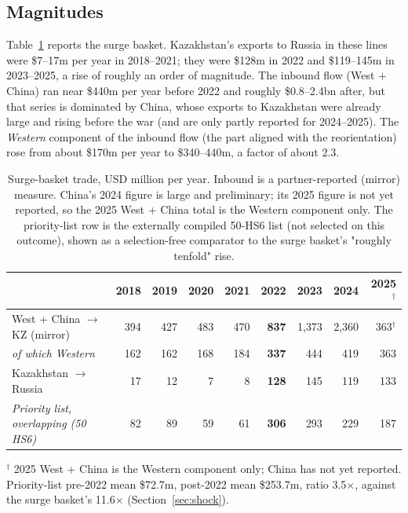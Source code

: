 \documentclass[12pt]{article}
\begin{document}
\subsection{Magnitudes}

Table~\ref{tab:magnitudes} reports the surge basket. Kazakhstan's exports to Russia in these
lines were \$7--17m per year in 2018--2021; they were \$128m in 2022 and \$119--145m in
2023--2025, a rise of roughly an order of magnitude. The inbound flow (West + China) ran near \$440m per year before 2022 and roughly
\$0.8--2.4bn after, but that series is dominated by China, whose exports to Kazakhstan were
already large and rising before the war (and are only partly reported for 2024--2025). The
\emph{Western} component of the inbound flow (the part aligned with the reorientation) rose
from about \$170m per year to \$340--440m, a factor of about $2.3$.

\begin{table}[t]
\centering
\caption{Surge-basket trade, USD million per year. Inbound is a partner-reported (mirror)
measure. China's 2024 figure is large and preliminary; its 2025 figure is not yet reported,
so the 2025 West + China total is the Western component only. The priority-list row is the
externally compiled 50-HS6 list (not selected on this outcome), shown as a selection-free
comparator to the surge basket's "roughly tenfold" rise.}
\label{tab:magnitudes}
\small
\setlength{\tabcolsep}{4pt}
\begin{tabular}{lrrrrrrrr}
\toprule
 & 2018 & 2019 & 2020 & 2021 & \textbf{2022} & 2023 & 2024 & 2025$^{\dagger}$ \\
\midrule
West + China $\to$ KZ (mirror) & 394 & 427 & 483 & 470 & \textbf{837} & 1{,}373 & 2{,}360 & 363$^{\dagger}$ \\
\quad \emph{of which Western}   & 162 & 162 & 168 & 184 & \textbf{337} & 444 & 419 & 363 \\
Kazakhstan $\to$ Russia        &  17 &  12 &   7 &   8 & \textbf{128} & 145 & 119 & 133 \\
\emph{Priority list, overlapping (50 HS6)} & 82 & 89 & 59 & 61 & \textbf{306} & 293 & 229 & 187 \\
\bottomrule
\end{tabular}

\vspace{2pt}
\footnotesize $^{\dagger}$ 2025 West + China is the Western component only; China has not yet
reported. Priority-list pre-2022 mean \$72.7m, post-2022 mean \$253.7m, ratio 3.5$\times$,
against the surge basket's 11.6$\times$ (Section~\ref{sec:shock}).
\end{table}
\end{document}
